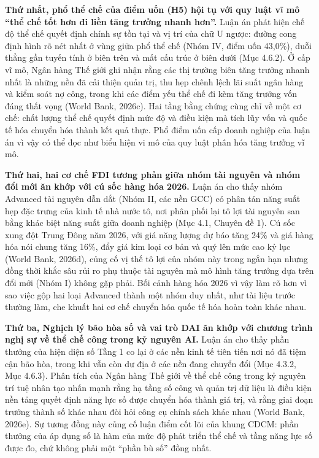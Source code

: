 \documentclass[
  a4paper,
  13pt]{extreport}
\begin{document}
\textbf{Thứ nhất, phổ thể chế của điểm uốn (H5) hội tụ với quy luật vĩ
mô ``thể chế tốt hơn đi liền tăng trưởng nhanh hơn''.} Luận án phát hiện
chế độ thể chế quyết định chính sự tồn tại và vị trí của chữ U ngược:
đường cong định hình rõ nét nhất ở vùng giữa phổ thể chế (Nhóm IV, điểm
uốn 43,0\%), duỗi thẳng gần tuyến tính ở biên trên và mất cấu trúc ở
biên dưới (Mục 4.6.2). Ở cấp vĩ mô, Ngân hàng Thế giới ghi nhận rằng các
thị trường biên tăng trưởng nhanh nhất là những nền đã cải thiện quản
trị, thu hẹp chênh lệch lãi suất ngân hàng và kiểm soát nợ công, trong
khi các điểm yếu thể chế đi kèm tăng trưởng vốn đáng thất vọng (World
Bank, 2026c). Hai tầng bằng chứng cùng chỉ về một cơ chế: chất lượng thể
chế quyết định mức độ và điều kiện mà tích lũy vốn và quốc tế hóa chuyển
hóa thành kết quả thực. Phổ điểm uốn cấp doanh nghiệp của luận án vì vậy
có thể đọc như biểu hiện vi mô của quy luật phân hóa tăng trưởng vĩ mô.

\textbf{Thứ hai, hai cơ chế FDI tương phản giữa nhóm tài nguyên và nhóm
đổi mới ăn khớp với cú sốc hàng hóa 2026.} Luận án cho thấy nhóm
Advanced tài nguyên dẫn dắt (Nhóm II, các nền GCC) có phân tán năng suất
hẹp đặc trưng của kinh tế nhà nước tô, nơi phân phối lại tô lợi tài
nguyên san bằng khác biệt năng suất giữa doanh nghiệp (Mục 4.1, Chuyên
đề 1). Cú sốc xung đột Trung Đông năm 2026, với giá năng lượng dự báo
tăng 24\% và giá hàng hóa nói chung tăng 16\%, đẩy giá kim loại cơ bản
và quý lên mức cao kỷ lục (World Bank, 2026d), củng cố vị thế tô lợi của
nhóm này trong ngắn hạn nhưng đồng thời khắc sâu rủi ro phụ thuộc tài
nguyên mà mô hình tăng trưởng dựa trên đổi mới (Nhóm I) không gặp phải.
Bối cảnh hàng hóa 2026 vì vậy làm rõ hơn vì sao việc gộp hai loại
Advanced thành một nhóm duy nhất, như tài liệu trước thường làm, che
khuất hai cơ chế chuyển hóa quốc tế hóa hoàn toàn khác nhau.

\textbf{Thứ ba, Nghịch lý bão hòa số và vai trò DAI ăn khớp với chương
trình nghị sự về thể chế công trong kỷ nguyên AI.} Luận án cho thấy phần
thưởng của hiện diện số Tầng 1 co lại ở các nền kinh tế tiên tiến nơi nó
đã tiệm cận bão hòa, trong khi vẫn còn dư địa ở các nền đang chuyển đổi
(Mục 4.3.2, Mục 4.6.3). Phân tích của Ngân hàng Thế giới về thể chế công
trong kỷ nguyên trí tuệ nhân tạo nhấn mạnh rằng hạ tầng số công và quản
trị dữ liệu là điều kiện nền tảng quyết định năng lực số được chuyển hóa
thành giá trị, và rằng giai đoạn trưởng thành số khác nhau đòi hỏi công
cụ chính sách khác nhau (World Bank, 2026e). Sự tương đồng này củng cố
luận điểm cốt lõi của khung CDCM: phần thưởng của áp dụng số là hàm của
mức độ phát triển thể chế và tầng năng lực số được đo, chứ không phải
một ``phần bù số'' đồng nhất.
\end{document}
